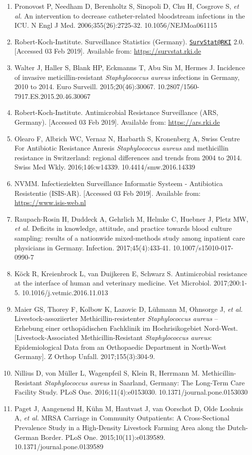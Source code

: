 \documentclass[
]{book}
\begin{document}
\begin{enumerate}
\item
  Pronovost P, Needham D, Berenholtz S, Sinopoli D, Chu H, Cosgrove S, \emph{et al.} An intervention to decrease catheter-related bloodstream infections in the ICU. N Engl J Med. 2006;355(26):2725-32. 10.1056/NEJMoa061115
\item
  Robert-Koch-Institute. Surveillance Statistics (Germany). \href{mailto:SurvStat@RKI}{\nolinkurl{SurvStat@RKI}} 2.0. {[}Accessed 03 Feb 2019{]}. Available from: \url{https://survstat.rki.de}
\item
  Walter J, Haller S, Blank HP, Eckmanns T, Abu Sin M, Hermes J. Incidence of invasive meticillin-resistant \emph{Staphylococcus aureus} infections in Germany, 2010 to 2014. Euro Surveill. 2015;20(46):30067. 10.2807/1560-7917.ES.2015.20.46.30067
\item
  Robert-Koch-Institute. Antimicrobial Resistance Surveillance (ARS, Germany). {[}Accessed 03 Feb 2019{]}. Available from: \url{https://ars.rki.de}
\item
  Olearo F, Albrich WC, Vernaz N, Harbarth S, Kronenberg A, Swiss Centre For Antibiotic Resistance Anresis \emph{Staphylococcus aureus} and methicillin resistance in Switzerland: regional differences and trends from 2004 to 2014. Swiss Med Wkly. 2016;146:w14339. 10.4414/smw.2016.14339
\item
  NVMM. Infectieziekten Surveillance Informatie Systeem - Antibiotica Resistentie (ISIS-AR). {[}Accessed 03 Feb 2019{]}. Available from: \url{https://www.isis-web.nl}
\item
  Raupach-Rosin H, Duddeck A, Gehrlich M, Helmke C, Huebner J, Pletz MW, \emph{et al.} Deficits in knowledge, attitude, and practice towards blood culture sampling: results of a nationwide mixed-methods study among inpatient care physicians in Germany. Infection. 2017;45(4):433-41. 10.1007/s15010-017-0990-7
\item
  Köck R, Kreienbrock L, van Duijkeren E, Schwarz S. Antimicrobial resistance at the interface of human and veterinary medicine. Vet Microbiol. 2017;200:1-5. 10.1016/j.vetmic.2016.11.013
\item
  Maier GS, Thorey F, Kolbow K, Lazovic D, Lühmann M, Ohnsorge J, \emph{et al.} Livestock-assoziierter Methicillin-resistenter \emph{Staphylococcus aureus} -- Erhebung einer orthopädischen Fachklinik im Hochrisikogebiet Nord-West. {[}Livestock-Associated Methicillin-Resistant \emph{Staphylococcus aureus}: Epidemiological Data from an Orthopaedic Department in North-West Germany{]}. Z Orthop Unfall. 2017;155(3):304-9.
\item
  Nillius D, von Müller L, Wagenpfeil S, Klein R, Herrmann M. Methicillin-Resistant \emph{Staphylococcus aureus} in Saarland, Germany: The Long-Term Care Facility Study. PLoS One. 2016;11(4):e0153030. 10.1371/journal.pone.0153030
\item
  Paget J, Aangenend H, Kühn M, Hautvast J, van Oorschot D, Olde Loohuis A, \emph{et al.} MRSA Carriage in Community Outpatients: A Cross-Sectional Prevalence Study in a High-Density Livestock Farming Area along the Dutch-German Border. PLoS One. 2015;10(11):e0139589. 10.1371/journal.pone.0139589
\end{enumerate}

  
\end{document}
